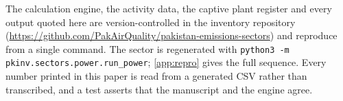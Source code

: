 \documentclass[5p,times,authoryear]{elsarticle}
\begin{document}
The calculation engine, the activity data, the captive plant register and every output quoted
here are version-controlled in the inventory repository
(\url{https://github.com/PakAirQuality/pakistan-emissions-sectors}) and reproduce from a single command. The sector is regenerated
with \texttt{python3 -m pkinv.sectors.power.run\_power}; \ref{app:repro} gives the full
sequence. Every number printed in this paper is read from a generated CSV rather than
transcribed, and a test asserts that the manuscript and the engine agree.




\appendix
\renewcommand{\thetable}{\arabic{table}}%
\renewcommand{\thefigure}{\arabic{figure}}%


\end{document}
